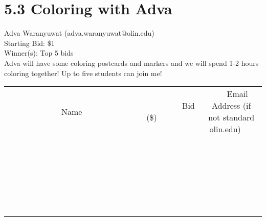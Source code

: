 \documentclass[11pt]{article}
\begin{document}
					\section*{5.3 Coloring with Adva}
					Adva Waranyuwat (adva.waranyuwat@olin.edu) \\
					Starting Bid: \$1 \\
					Winner(s): Top 5 bids \\
					Adva will have some coloring postcards and markers and we will spend 1-2 hours coloring together!  Up to five students can join me! \\
					[6ex]
					\begin{tabular}{c c c}
						~~~~~~~~~~~~~Name~~~~~~~~~~~~~ & ~~~~~~~~~Bid (\$)~~~~~~~~~ & ~~~Email Address (if not standard olin.edu)~~~ \\
				
 & & \\
\hline
 & & \\
\hline
 & & \\
\hline
 & & \\
\hline
 & & \\
\hline
 & & \\
\hline
 & & \\
\hline
 & & \\
\hline
 & & \\
\hline
 & & \\
\hline
 & & \\
\hline
 & & \\
\hline
 & & \\
\hline
 & & \\
\hline
 & & \\
\hline
 & & \\
\hline
 & & \\
\hline
 & & \\
\hline
 & & \\
\hline
 & & \\
\hline
 & & \\
\hline
 & & \\
\hline
 & & \\
\hline
 & & \\
\hline
 & & \\
\hline
 & & \\
\hline
					\end{tabular}
					\clearpage
				
\end{document}

